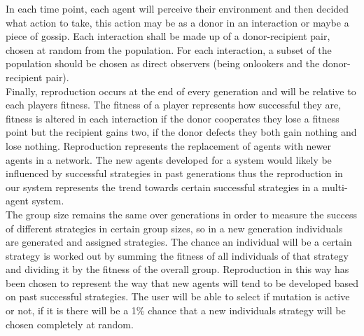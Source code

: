 \documentclass[twoside,twocolumn]{article}
\begin{document}
In each time point, each agent will perceive their environment and then decided what action to take, this action may be as a donor in an interaction or maybe a piece of gossip. Each interaction shall be made up of a donor-recipient pair, chosen at random from the population. For each interaction, a subset of the population should be chosen as direct observers (being onlookers and the donor-recipient pair).\\
Finally, reproduction occurs at the end of every generation and will be relative to each players fitness. The fitness of a player represents how successful they are, fitness is altered in each interaction if the donor cooperates they lose a fitness point but the recipient gains two, if the donor defects they both gain nothing and lose nothing. Reproduction represents the replacement of agents with newer agents in a network. The new agents developed for a system would likely be influenced by successful strategies in past generations thus the reproduction in our system represents the trend towards certain successful strategies in a multi-agent system.\\
The group size remains the same over generations in order to measure the success of different strategies in certain group sizes, so in a new generation individuals are generated and assigned strategies. The chance an individual will be a certain strategy is worked out by summing the fitness of all individuals of that strategy and dividing it by the fitness of the overall group. Reproduction in this way has been chosen to represent the way that new agents will tend to be developed based on past successful strategies. The user will be able to select if mutation is active or not, if it is there will be a 1\% chance that a new individuals strategy will be chosen completely at random.
\end{document}
